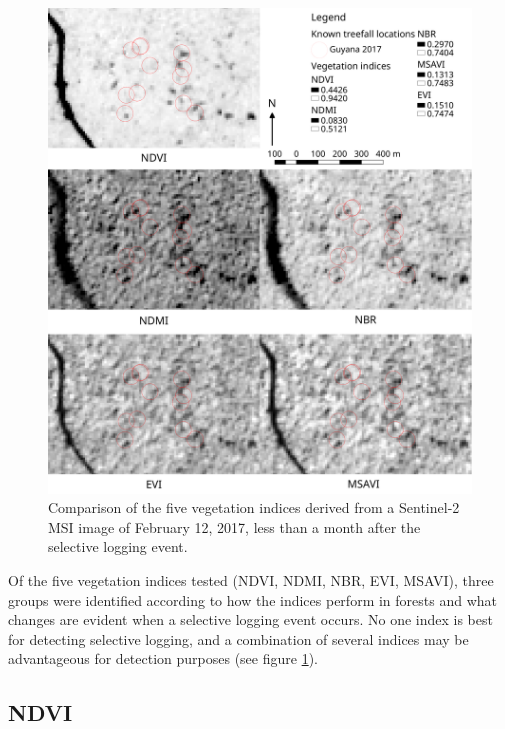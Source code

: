 \documentclass[a4paper,12pt]{scrbook}
\begin{document}
\begin{figure}
  \centering
  \includegraphics[width=\textwidth]{thesis-figures/19-guyana17-vis}
  \caption{Comparison of the five vegetation indices derived from a Sentinel-2 \ac{MSI} image of February 12, 2017, less than a month after the selective logging event.}
  \label{fig-guyana17-vi}
\end{figure}


Of the five vegetation indices tested (\ac{NDVI}, \ac{NDMI}, \ac{NBR}, \ac{EVI}, \ac{MSAVI}), three groups were identified according to how the indices perform in forests and what changes are evident when a selective logging event occurs. No one index is best for detecting selective logging, and a combination of several indices may be advantageous for detection purposes (see figure \ref{fig-guyana17-vi}).

\subsection{NDVI}
\end{document}
